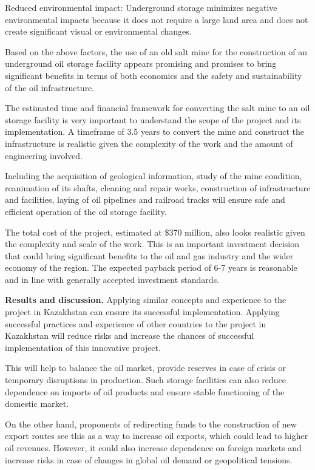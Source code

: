 Reduced environmental impact: Underground storage minimizes negative
environmental impacts because it does not require a large land area and
does not create significant visual or environmental changes.

Based on the above factors, the use of an old salt mine for the
construction of an underground oil storage facility appears promising
and promises to bring significant benefits in terms of both economics
and the safety and sustainability of the oil infrastructure.

The estimated time and financial framework for converting the salt mine
to an oil storage facility is very important to understand the scope of
the project and its implementation. A timeframe of 3.5 years to convert
the mine and construct the infrastructure is realistic given the
complexity of the work and the amount of engineering involved.

Including the acquisition of geological information, study of the mine
condition, reanimation of its shafts, cleaning and repair works,
construction of infrastructure and facilities, laying of oil pipelines
and railroad tracks will ensure safe and efficient operation of the oil
storage facility.

The total cost of the project, estimated at \$370 million, also looks
realistic given the complexity and scale of the work. This is an
important investment decision that could bring significant benefits to
the oil and gas industry and the wider economy of the region. The
expected payback period of 6-7 years is reasonable and in line with
generally accepted investment standards.

{\bfseries Results and discussion.} Applying similar concepts and
experience to the project in Kazakhstan can ensure its successful
implementation. Applying successful practices and experience of other
countries to the project in Kazakhstan will reduce risks and increase
the chances of successful implementation of this innovative project.

This will help to balance the oil market, provide reserves in case of
crisis or temporary disruptions in production. Such storage facilities
can also reduce dependence on imports of oil products and ensure stable
functioning of the domestic market.

On the other hand, proponents of redirecting funds to the construction
of new export routes see this as a way to increase oil exports, which
could lead to higher oil revenues. However, it could also increase
dependence on foreign markets and increase risks in case of changes in
global oil demand or geopolitical tensions.

